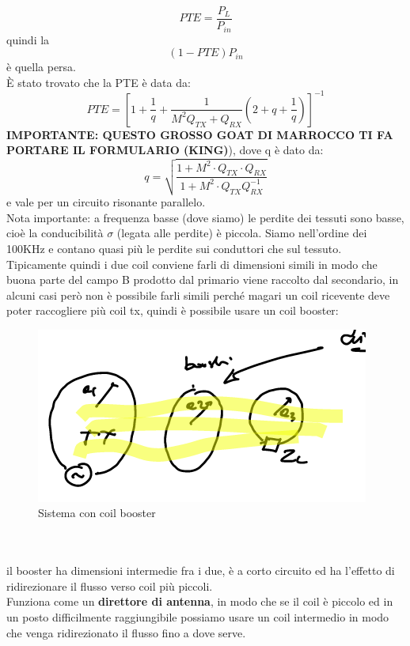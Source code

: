 \documentclass[oneside, 12pt]{extbook}
\begin{document}
\begin{equation}
PTE = \frac{P_L}{P_{in}}	
\end{equation}
quindi la 
\begin{equation}
	(1-PTE)P_{in}	
\end{equation}
è quella persa.\\È stato trovato che la PTE è data da:
\begin{equation}
	PTE = [1 + \frac{1}{q} + \dfrac{1}{M^2 Q_{TX} + Q_{RX}}(2 + q + \frac{1}{q})]^{-1}
\end{equation}
 \textbf{IMPORTANTE: QUESTO GROSSO GOAT DI MARROCCO TI FA PORTARE IL FORMULARIO (KING)}), dove q è dato da:
\begin{equation}
	q = \sqrt{\dfrac{1 + M^2\cdot Q_{TX}\cdot Q_{RX}}{1 + M^2 \cdot Q_{TX} Q_{RX}^{-1}}}
\end{equation}
e vale per un circuito risonante parallelo.\\Nota importante: a frequenza basse (dove siamo) le perdite dei tessuti sono basse, cioè la conducibilità $\sigma$ (legata alle perdite) è piccola. Siamo nell'ordine dei 100KHz e contano quasi più le perdite sui conduttori che sul tessuto.\\Tipicamente quindi i due coil conviene farli di dimensioni simili in modo che buona parte del campo B prodotto dal primario viene raccolto dal secondario, in alcuni casi però non è possibile farli simili perché magari un coil ricevente deve poter raccogliere più coil tx, quindi è possibile usare un coil booster:\\
\begin{figure}
	\includegraphics[scale=1]{immagini/booster_coil.png}
	\caption{Sistema con coil booster}
\end{figure}
\\\\
il booster ha dimensioni intermedie fra i due, è a corto circuito ed ha l'effetto di ridirezionare il flusso verso coil più piccoli.\\Funziona come un \textbf{direttore di antenna}, in modo che se il coil è piccolo ed in un posto difficilmente raggiungibile possiamo usare un coil intermedio in modo che venga ridirezionato il flusso fino a dove serve.
\end{document}
